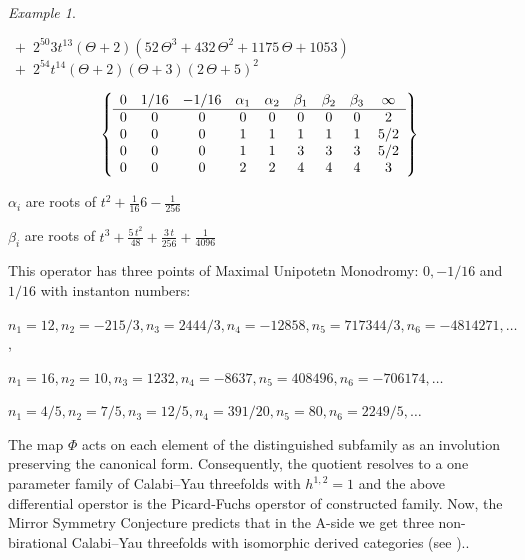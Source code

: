 \documentclass[12pt]{amsart}
\theoremstyle{plain}
\theoremstyle{remark}
\newtheorem{exmp}{Example}
\theoremstyle{definition}
\numberwithin{table}{section}
\begin{document}
\begin{exmp}
\begin{center}
	\mbox{\(\displaystyle\; + \; 2 ^{50} 3 t^{13}(\Theta+2)(52\,{\Theta}^{3}+432\,{\Theta}^{2}+1175\,\Theta+1053)\)}\\
	\mbox{\(\displaystyle\; + \; 2 ^{54}t^{14}(\Theta+2)(\Theta+3)(2\,\Theta+5)^{2}\)}
\end{center}
\[\left\{\begin{array}{*{9}c}
	0& 1/16& -1/16& \alpha_{1}& \alpha_{2}& \beta_{1} & \beta_{2} & \beta_{3} & \infty \\
	\hline0 & 0 & 0 & 0 & 0 & 0 & 0 & 0 & 2 \\
	0 & 0 & 0 & 1 & 1 & 1 & 1 & 1 & 5/2 \\
	0 & 0 & 0 & 1 & 1 & 3 & 3 & 3 & 5/2 \\
	0 & 0 & 0 & 2 & 2 & 4 & 4 & 4 & 3 \\
\end{array}\right\}\]


$\alpha_{i}$ are roots of $t^{2}+\frac1{16}6-\frac1{256}$

$\beta_{i}$ are roots of ${t}^{3}+{\frac {5\,{t}^{2}}{48}}+{\frac {3\,t}{256}}+{\frac{1}{4096}}$

This operator has three points of Maximal Unipotetn Monodromy: $0, -1/16$ and $1/16$ with instanton numbers:

$n_{1}=12, n_{2}=-215/3, n_{3}=2444/3, n_{4}=-12858, n_{5}=717344/3, n_{6}=-4814271, \dots$,

$n_{1}=16, n_{2}=10, n_{3}=1232, n_{4}=-8637, n_{5}=408496, n_{6}=-706174, \dots$

$n_{1}=4/5, n_{2}=7/5, n_{3}=12/5, n_{4}=391/20, n_{5}=80, n_{6}=2249/5, \dots$

The map $\Phi$ acts on each element of the distinguished subfamily as an involution preserving the canonical form. Consequently, the quotient resolves to a one parameter family of Calabi--Yau threefolds with $h^{1,2}=1$ and the above differential operstor is the Picard-Fuchs operstor of constructed family. Now, the Mirror Symmetry Conjecture predicts that in the A-side we get three non-birational Calabi--Yau threefolds with isomorphic derived categories (see \cite{vS})..


\end{exmp}
\end{document}
